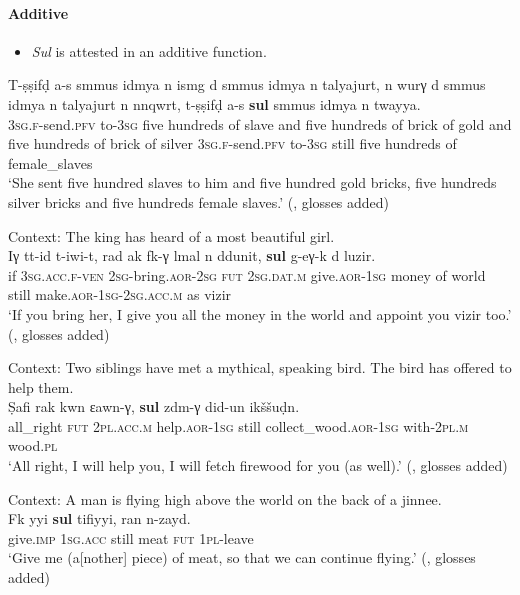 \paragraph{Additive}\label{appendixTashelhyitAdditive}
\begin{itemize}
	\item \textit{Sul} is attested in an additive function.
\end{itemize}
\begin{exe}
	\ex
	\gll T-ṣṣifḍ a-s smmus idmya n ismg d smmus idmya n talyajurt, n wurγ d smmus idmya n talyajurt n nnqwrt, t-ṣṣifḍ a-s \textbf{sul} smmus idmya n twayya.\\
	3\textsc{sg}.\textsc{f}-send.\textsc{pfv} to-3\textsc{sg} five hundreds of slave and five hundreds of brick of gold and five hundreds of brick of silver 3\textsc{sg}.\textsc{f}-send.\textsc{pfv} to-3\textsc{sg} still five hundreds of female\_slaves\\
	\glt \lq She sent five hundred slaves to him and five hundred gold bricks, five hundreds silver bricks and five hundreds female slaves.\rq{} (\cite[130]{Stroomer2001}, glosses added) 

	\ex
	Context: The king has heard of a most beautiful girl.\\
	\gll Iγ tt-id	t-iwi-t, rad ak fk-γ lmal n ddunit, \textbf{sul} g-eγ-k d luzir.\\
	if 3\textsc{sg}.\textsc{acc}.\textsc{f}-\textsc{ven} 2\textsc{sg}-bring.\textsc{aor}-2\textsc{sg} \textsc{fut} 2\textsc{sg}.\textsc{dat}.\textsc{m} give.\textsc{aor}-1\textsc{sg} money of world still make.\textsc{aor}-1\textsc{sg}-2\textsc{sg}.\textsc{acc}.\textsc{m} as vizir\\
	\glt \lq If you bring her, I give you all the money in the world and appoint you vizir too.' (\cite[137]{Stroomer2002}, glosses added) 

	\ex
	Context: Two siblings have met a mythical, speaking bird. The bird has offered to help them.\\
	\gll Ṣafi rak kwn εawn-γ, \textbf{sul} zdm-γ did-un ikššuḍn.\\
	all\_right \textsc{fut} 2\textsc{pl}.\textsc{acc}.\textsc{m} help.\textsc{aor}-1\textsc{sg} still collect\_wood.\textsc{aor}-1\textsc{sg} with-2\textsc{pl}.\textsc{m} wood.\textsc{pl}\\
	\glt \lq All right, I will help you, I will fetch firewood for you (as well).' (\cite[200]{Stroomer2001}, glosses added)

	\ex\label{exAppendixTashelhyitAdditive4}
	Context: A man is flying high above the world on the back of a jinnee.\\
	\gll Fk					yyi 				\textbf{sul}		tifiyyi,		ran	n-zayd.\\
	give.\textsc{imp} 1\textsc{sg}.\textsc{acc} still meat \textsc{fut} 1\textsc{pl}-leave\\
	\glt \lq Give me (a[nother] piece) of meat, so that we can continue flying.\rq{ }(\cite[116]{Stroomer2002}, glosses added)
\end{exe}

